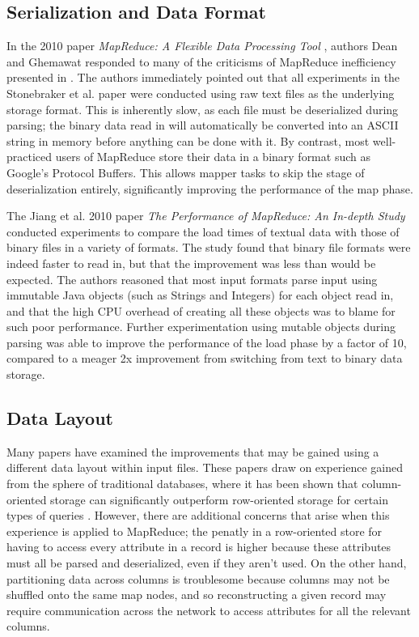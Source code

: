 \documentclass[twocolumn]{article}
\begin{document}
\subsection{Serialization and Data Format}

In the 2010 paper \emph{MapReduce: A Flexible Data Processing Tool} \cite{ref:friends-or-foes-resp},
authors Dean and Ghemawat responded to many of the criticisms of MapReduce inefficiency
presented in \cite{ref:friends-or-foes}.  The authors immediately pointed out that all experiments
in the Stonebraker et al. paper were conducted using raw text files as the underlying storage
format.  This is inherently slow, as each file must be deserialized during parsing; the binary
data read in will automatically be converted into an ASCII string in memory before anything can
be done with it.  By contrast, most well-practiced users of MapReduce store their data in a binary
format such as Google's Protocol Buffers.
This allows mapper tasks to skip the stage of deserialization entirely, significantly
improving the performance of the map phase.

The Jiang et al. 2010 paper \emph{The Performance of MapReduce: An In-depth Study}
\cite{ref:perf-study} conducted experiments to compare
the load times of textual data with those of binary files in a variety of formats.
The study found that binary file formats were indeed faster to read in, but that the
improvement was less than would be expected.  The authors reasoned that most input formats
parse input using immutable Java objects (such as Strings and Integers) for each object
read in, and that the high CPU overhead of creating all
these objects was to blame for such poor performance.  Further experimentation
using mutable objects during parsing was able to improve the performance of the load phase
by a factor of 10, compared to a meager 2x improvement from switching from text to binary
data storage.

\subsection{Data Layout}

Many papers have examined the improvements that may be gained using a different
data layout within input files.  These papers draw on experience gained from 
the sphere of traditional databases, where it has been shown that column-oriented
storage can significantly outperform row-oriented storage for
certain types of queries \cite{ref:colstores}.  However, there are additional
concerns that arise when this experience is applied to MapReduce; the penatly
in a row-oriented store for having to access every attribute in a record is higher because
these attributes must all be parsed and deserialized, even if they aren't used.
On the other hand, partitioning data across columns is troublesome because 
columns may not be shuffled onto the same map nodes, and so reconstructing
a given record may require communication across the network to access attributes
for all the relevant columns.
\end{document}
